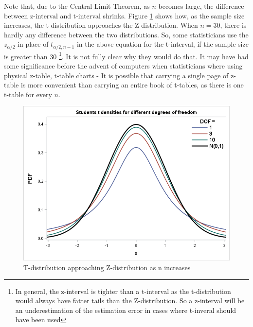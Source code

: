 Note that, due to the Central Limit Theorem, as $n$ becomes large, the difference between z-interval and t-interval shrinks. Figure \ref{fig:T-Z-distributions} shows how, as the sample size increases, the t-distribution approaches the Z-distribution. When $n=30$, there is hardly any difference between the two distributions. So, some statisticians use the \(z_{\alpha/2}\) in place of \(  t_{\alpha/2,n-1} \) in the above equation for the t-interval,  if the sample size is greater than 30 \footnote{In general, the z-interval is tighter than a t-interval as the t-distribution would always have fatter tails than the Z-distribution. So a z-interval will be an underestimation of the estimation error in cases where t-inveral should have been used}. It is not fully clear why they would do that. It may have had some significance before the advent of computers when statisticians where using physical z-table, t-table charts - It is possible that carrying a single page of z-table is more convenient than carrying an entire book of t-tables, as there is one t-table for every $n$. 
	\begin{figure}
	  \centering
	    \includegraphics[width=\textwidth]{Statistics/T-Z-distributions}
	  \caption{T-distribution approaching Z-distribution as n increases}
	  \label{fig:T-Z-distributions}
	\end{figure}
	
